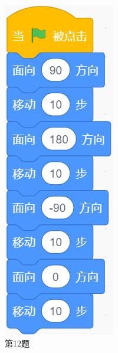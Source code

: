 \documentclass[10pt, a4paper]{article}
\begin{document}
\begin{enumerate}
\begin{figure}[htbp]
\begin{minipage}[t]{.07\textwidth}
                \caption*{第12题}
            \end{minipage}
            \begin{minipage}[t]{.08\textwidth}
                \centering
                \includegraphics[width=\textwidth]{13.png}

\end{minipage}
\end{figure}
\end{enumerate}
\end{document}
